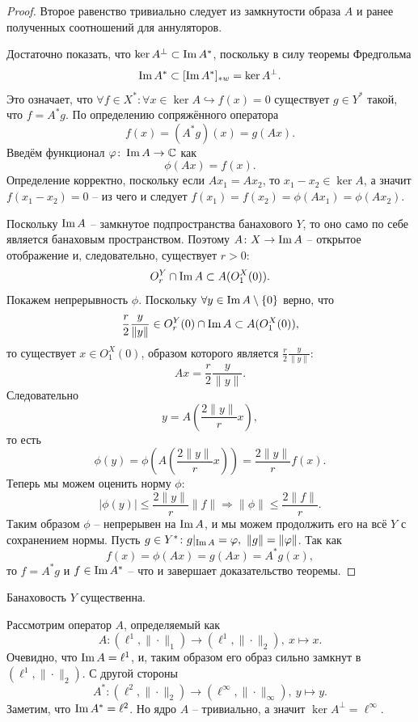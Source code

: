 \begin{proof}
    Второе равенство тривиально следует из замкнутости образа $A$ и ранее полученных соотношений для аннуляторов.

    Достаточно показать, что $\ker A ^\perp \subset \operatorname{Im} A^*$, поскольку в силу теоремы Фредгольма
    \[
        \operatorname{Im} A^* \subset [\operatorname{Im} A^*]_{*w} = \ker A^{\perp}.
    \]
    Это означает, что $\forall f \in X^*\colon \forall x \in \ker A \hookrightarrow f(x) = 0$ существует $g \in Y^*$ такой, что $f = A^* g$.
    По определению сопряжённого оператора
    \[
        f(x) = (A^* g)(x) = g(Ax).
    \]
    Введём функционал $\varphi\colon \operatorname{Im} A \to \mathbb{C}$ как
    \[
        \phi(Ax) = f(x).
    \]
    Определение корректно, поскольку если $Ax_1 = Ax_2$, то $x_1 - x_2 \in \ker A$, а значит $f(x_1 - x_2) = 0$ -- из чего и следует $f(x_1) = f(x_2) = \phi(Ax_1) = \phi(Ax_2)$.

    Поскольку $\operatorname{Im} A$ -- замкнутое подпространства банахового $Y$, то оно само по себе является банаховым пространством.
    Поэтому $A\colon X \to \operatorname{Im} A$ -- открытое отображение и, следовательно, существует $r > 0$:
    \[
        O_r^Y \cap \operatorname{Im} A \subset A(O_1^X(0)).
    \]
    Покажем непрерывность $\phi$.
    Поскольку $\forall y \in \operatorname{Im} A \setminus \{0\}$ верно, что
    \[
        \frac{r}{2}\frac{y}{\|y\|} \in O_r^Y(0) \cap \operatorname{Im} A \subset A(O_1^X(0)),
    \]
    то существует $x \in O_1^X(0)$, образом которого является $\frac{r}{2}\frac{y}{\|y\|}$:
    \[
        Ax = \frac{r}{2}\frac{y}{\|y\|}.
    \]
    Следовательно
    \[
        y = A\left(\frac{2\|y\|}{r}x\right),
    \]
    то есть
    \[
        \phi(y) = \phi\left(A\left(\frac{2\|y\|}{r}x\right)\right) = \frac{2\|y\|}{r}f(x).
    \]
    Теперь мы можем оценить норму $\phi$:
    \[
        |\phi(y)| \leq \frac{2\|y\|}{r}\|f\| \Rightarrow \|\phi\| \leq \frac{2\|f\|}{r}.
    \]
    Таким образом $\phi$ -- непрерывен на $\operatorname{Im} A$, и мы можем продолжить его на всё $Y$ с сохранением нормы.
    Пусть $g\in Y^*\colon g|_{\operatorname{Im} A} = \varphi, \ \|g\|=\|\varphi\|$.
    Так как
    \[
        f(x) = \phi(Ax) = g(Ax) = A^* g(x),
    \]
    то $f = A^* g$ и $f \in \operatorname{Im} A^*$ -- что и завершает доказательство теоремы.
\end{proof}
\begin{example}
    Банаховость $Y$ существенна.

    Рассмотрим оператор $A$, определяемый как
    \[
        A\colon (\ell^1, \|\cdot\|_1) \to (\ell^1, \|\cdot\|_2), \ x \mapsto x.
    \]
    Очевидно, что $\operatorname{Im} A = \ell^1$, и, таким образом его образ сильно замкнут в $(\ell^1, \|\cdot\|_2)$.
    С другой стороны
    \[
        A^*\colon (\ell^2, \|\cdot\|_2) \to (\ell^\infty, \|\cdot\|_\infty),\  y \mapsto y.
    \]
    Заметим, что $\operatorname{Im} A^* = \ell^2$.
    Но ядро $A$ -- тривиально, а значит $\ker A ^\perp = \ell^\infty$.

\end{example}
